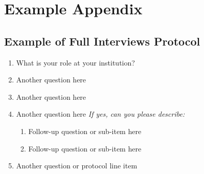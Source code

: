
\chapter{Example Appendix}


\section{Example of Full Interviews Protocol}
\label{sec:interview_protocol}
\begin{enumerate}
    \item What is your role at your institution?
    \item Another question here
    \item Another question here
    \item Another question here
        \textit{If yes, can you please describe:}
        \begin{enumerate}
            \item Follow-up question or sub-item here
            \item Follow-up question or sub-item here
        \end{enumerate}
    \item Another question or protocol line item
\end{enumerate}

